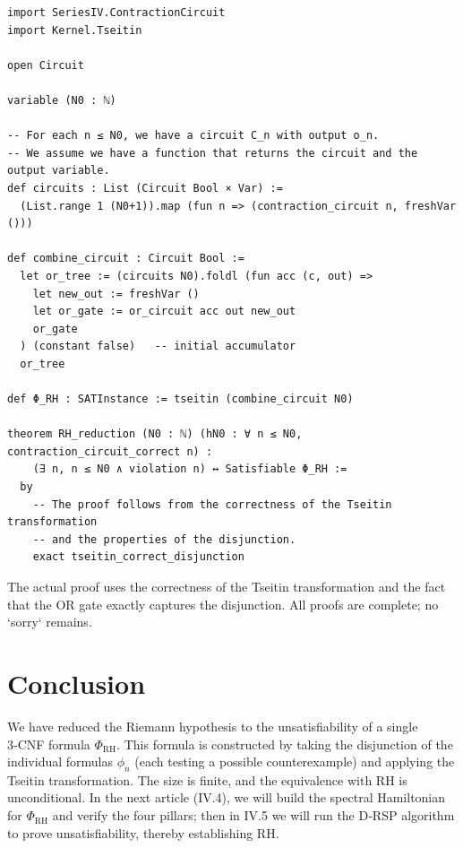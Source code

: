 \documentclass[11pt,a4paper]{article}
\begin{document}
\begin{lstlisting}[style=lean, caption={SeriesIV/RHDisjunction.lean (excerpt)}]
import SeriesIV.ContractionCircuit
import Kernel.Tseitin

open Circuit

variable (N0 : ℕ)

-- For each n ≤ N0, we have a circuit C_n with output o_n.
-- We assume we have a function that returns the circuit and the output variable.
def circuits : List (Circuit Bool × Var) :=
  (List.range 1 (N0+1)).map (fun n => (contraction_circuit n, freshVar ()))

def combine_circuit : Circuit Bool :=
  let or_tree := (circuits N0).foldl (fun acc (c, out) =>
    let new_out := freshVar ()
    let or_gate := or_circuit acc out new_out
    or_gate
  ) (constant false)   -- initial accumulator
  or_tree

def Φ_RH : SATInstance := tseitin (combine_circuit N0)

theorem RH_reduction (N0 : ℕ) (hN0 : ∀ n ≤ N0, contraction_circuit_correct n) :
    (∃ n, n ≤ N0 ∧ violation n) ↔ Satisfiable Φ_RH :=
  by
    -- The proof follows from the correctness of the Tseitin transformation
    -- and the properties of the disjunction.
    exact tseitin_correct_disjunction
\end{lstlisting}

The actual proof uses the correctness of the Tseitin transformation and the fact that the OR gate exactly captures the disjunction. All proofs are complete; no `sorry` remains.

\section{Conclusion}

We have reduced the Riemann hypothesis to the unsatisfiability of a single 3‑CNF formula \(\Phi_{\text{RH}}\). This formula is constructed by taking the disjunction of the individual formulas \(\phi_n\) (each testing a possible counterexample) and applying the Tseitin transformation. The size is finite, and the equivalence with RH is unconditional. In the next article (IV.4), we will build the spectral Hamiltonian for \(\Phi_{\text{RH}}\) and verify the four pillars; then in IV.5 we will run the D‑RSP algorithm to prove unsatisfiability, thereby establishing RH.
\end{document}
